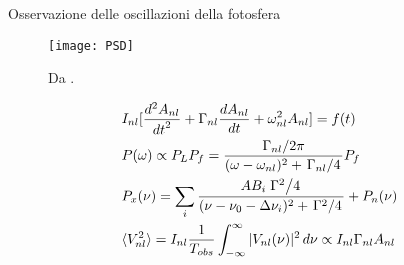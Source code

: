 \documentclass[10pt,xcolor={usenames},fleqn,mathserif,serif]{beamer}
\begin{document}
\begin{frame}{Osservazione delle oscillazioni della fotosfera}

\begin{figure}[!ht]


\texttt{[image: PSD]}
\caption{Da \cite{houdek2006stochastic}.}\label{fig:PSD}

\end{figure}

\begin{align*}
&I_{nl}[\TtwoDy{t}{A_{nl}}+\Gamma_{nl}\TDy{t}{A_{nl}}+\omega_{nl}^2A_{nl}]=f(t)\\
&P(\omega)\propto P_LP_f=\frac{\midfrac{\Gamma_{nl}}{2\pi}}{(\omega-\omega_{nl})^2+\midfrac{\Gamma_{nl}}{4}}P_f\\
&P_x(\nu)=\sum_i\frac{AB_i\midfrac{\Gamma^2}{4}}{(\nu-\nu_0-\Delta\nu_i)^2+\midfrac{\Gamma^2}{4}}+P_n(\nu)\\
&\exv{V_{nl}^2}=I_{nl}\frac{1}{T_{obs}}\int_{-\infty}^{\infty}|V_{nl}(\nu)|^2\,d\nu\propto I_{nl}\Gamma_{nl}A_{nl}
\end{align*}


\end{frame}
\end{document}
